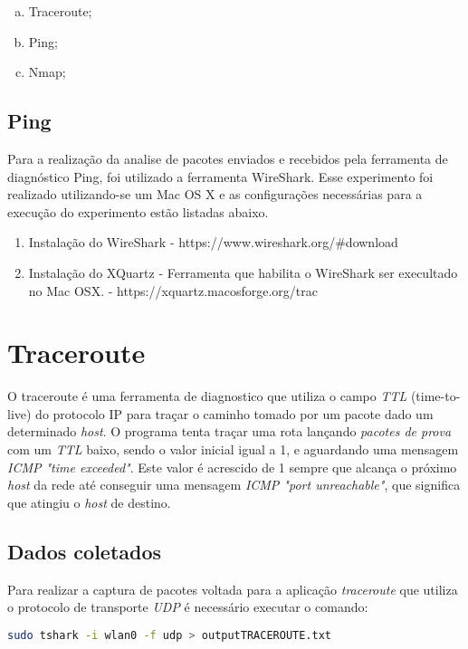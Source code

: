 \documentclass[a4paper]{report} %
\begin{document}
\begin{enumerate}[a)]
 \item Traceroute;
 \item Ping;
 \item Nmap;
\end{enumerate}

\subsection{Ping}
Para a realização da analise de pacotes enviados e recebidos pela ferramenta de diagnóstico Ping, foi utilizado a ferramenta WireShark. Esse experimento foi realizado utilizando-se um Mac OS X e as configurações necessárias para a execução do experimento estão listadas abaixo.

\begin{enumerate}
    \item Instalação do WireShark - https://www.wireshark.org/#download
    \item Instalação do XQuartz - Ferramenta que habilita o WireShark ser execultado no Mac OSX. - https://xquartz.macosforge.org/trac
\end{enumerate}


\section{Traceroute}
\label{sec_traceroute}
O traceroute é uma ferramenta de diagnostico que utiliza o campo \textit{TTL} (time-to-live) do protocolo IP para traçar o caminho tomado por um pacote dado um determinado \textit{host}. O programa tenta traçar uma rota lançando \textit{pacotes de prova} com um \textit{TTL} baixo, sendo o valor inicial igual a 1, e aguardando uma mensagem \textit{ICMP "time exceeded"}.  Este valor é acrescido de 1 sempre que alcança o próximo \textit{host} da rede até conseguir uma mensagem \textit{ICMP "port unreachable"}, que significa que atingiu o \textit{host} de destino.

\subsection{Dados coletados}
\label{sub_traceroute_dados}
Para realizar a captura de pacotes voltada para a aplicação \textit{traceroute} que utiliza o protocolo de transporte \textit{UDP} é necessário executar o comando:
\begin{lstlisting}[language=bash]
	sudo tshark -i wlan0 -f udp > outputTRACEROUTE.txt
\end{lstlisting}
\end{document}
